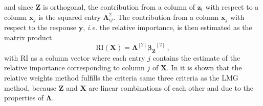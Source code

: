 and since $\mathbf{Z}$ is orthogonal, the contribution from a column of $\mathbf{z_i}$ with respect to a column $\mathbf{x}_j$ is the squared entry $\boldsymbol{\Lambda}_{ij}^2$.
The contribution from a column $\mathbf{x}_j$ with respect to the response $\mathbf{y}$, \textit{i.e.} the relative importance, is then estimated as the matrix product \citep{johnson_relative_weights}
\begin{equation}
    \label{eq:RI_lambda}
    \text{RI}(\mathbf{X}) = \boldsymbol{\Lambda}^{[2]} \boldsymbol{\beta_Z}^{[2]} \ , 
\end{equation}
with $\text{RI}$ as a column vector where each entry $j$ contains the estimate of the relative importance corresponding to column $j$ of $\mathbf{X}$.
In \citet[section 2.5.3]{matre} it is shown that the relative weights method fulfills the criteria same three criteria as the LMG method, because $\mathbf{Z}$ and $\mathbf{X}$ are linear combinations of each other and due to the properties of $\boldsymbol{\Lambda}$.





